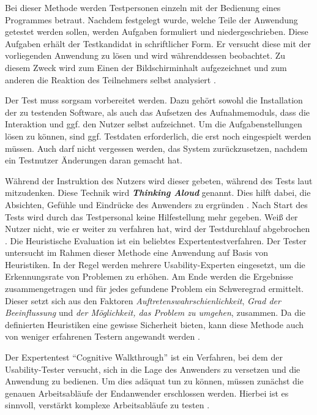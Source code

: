 Bei dieser Methode werden Testpersonen einzeln mit der Bedienung eines Programmes betraut. Nachdem festgelegt wurde, welche Teile der Anwendung getestet werden sollen, werden Aufgaben formuliert und niedergeschrieben. Diese Aufgaben erhält der Testkandidat in schriftlicher Form. Er versucht diese mit der vorliegenden Anwendung zu lösen und wird währenddessen beobachtet. Zu diesem Zweck wird zum Einen der Bildschirminhalt aufgezeichnet und zum anderen die Reaktion des Teilnehmers selbst analysiert \cite[S. 230]{Ullenboom2014}.\par
Der Test muss sorgsam vorbereitet werden. Dazu gehört sowohl die Installation der zu testenden Software, als auch das Aufsetzen des Aufnahmemoduls, dass die Interaktion und ggf. den Nutzer selbst aufzeichnet. Um die Aufgabenstellungen lösen zu können, sind ggf. Testdaten erforderlich, die erst noch eingespielt werden müssen. Auch darf nicht vergessen werden, das System zurückzusetzen, nachdem ein Testnutzer Änderungen daran gemacht hat. \cite[S.231]{Ullenboom2014}\par
Während der Instruktion des Nutzers wird dieser gebeten, während des Tests laut mitzudenken. Diese Technik wird \textbf{\textit{Thinking Aloud}} genannt. Dies hilft dabei, die Absichten, Gefühle und Eindrücke des Anwenders zu ergründen \cite[S. 1]{Fromman2005}. Nach Start des Tests wird durch das Testpersonal keine Hilfestellung mehr gegeben. Weiß der Nutzer nicht, wie er weiter zu verfahren hat, wird der Testdurchlauf abgebrochen \cite[S. 231]{Ullenboom2014}.
Die Heuristische Evaluation ist ein beliebtes Expertentestverfahren. Der Tester untersucht im Rahmen dieser Methode eine Anwendung auf Basis von Heuristiken. In der Regel werden mehrere Usability-Experten eingesetzt, um die Erkennungsrate von Problemen zu erhöhen. Am Ende werden die Ergebnisse zusammengetragen und für jedes gefundene Problem ein Schweregrad ermittelt. Dieser setzt sich aus den Faktoren \textit{Auftretenswahrschienlichkeit}, \textit{Grad der Beeinflussung} und \textit{der Möglichkeit, das Problem zu umgehen}, zusammen. Da die definierten Heuristiken eine gewisse Sicherheit bieten, kann diese Methode auch von weniger erfahrenen Testern angewandt werden \cite[S. 232f.]{Ullenboom2014}.\par
{}
Der Expertentest \enquote{Cognitive Walkthrough} ist ein Verfahren, bei dem der Usability-Tester versucht, sich in die Lage des Anwenders zu versetzen und die Anwendung zu bedienen. Um dies adäquat tun zu können, müssen zunächst die genauen Arbeitsabläufe der Endanwender erschlossen werden. Hierbei ist es sinnvoll, verstärkt komplexe Arbeitsabläufe zu testen \cite[S. 234]{Ullenboom2014}.\par
